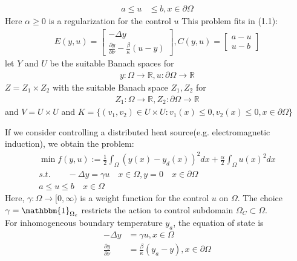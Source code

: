 \begin{example}
\begin{align*}
	a \le u &\le b, x \in \partial \Omega
\end{align*}
Here $\alpha \geq 0$ is a regularization for the control $u$
This problem fits in (1.1):
\begin{align*}
	E(y, u) = 
	\begin{bmatrix}
		- \Delta y \\
		\frac{\partial y}{\partial \nu} - \frac{\beta}{\kappa}(u - y)
	\end{bmatrix}, 
	C(y, u) =
	\begin{bmatrix}
		a - u\\
		u - b
	\end{bmatrix}
\end{align*}
let $Y$ and $U$ be the suitable Banach spaces for 
\begin{align*}
	y : \Omega \rightarrow \mathbb{R}, u: \partial \Omega \rightarrow \mathbb{R}
\end{align*}
$Z = Z_1 \times Z_2$ with the suitable Banach space $Z_1, Z_2$ for 
\begin{align*}
	Z_1: \Omega \rightarrow \mathbb{R}, Z_2: \partial \Omega \rightarrow \mathbb{R}
\end{align*}
and $V = U \times U$ and $K = \{(v_1, v_2) \in U \times U: v_1(x) \le 0, v_2(x) \le 0, x \in \partial \Omega\}$
\end{example}

\begin{example}
If we consider controlling a distributed heat source(e.g. electromagnetic induction), we obtain the problem:
\begin{align*}
	\min f(y, u):= \frac{1}{2} \int_\Omega (y(x) - y_d(x))^2 dx + \frac{\alpha}{2} \int_\Omega u(x)^2 dx\\
	s.t. \qquad - \Delta y = \gamma u \quad x \in\Omega, y= 0 \quad x \in \partial \Omega \\
	a \le u \le b \quad x \in \Omega
\end{align*}
	Here, $\gamma: \Omega \rightarrow [0, \infty)$ is a weight function for the control $u$ on $\Omega$. The choice $\gamma = \mathbbm{1}_{\Omega_c}$ restricts the action to control subdomain $\Omega_C \subset \Omega$. \\
	For inhomogeneous boundary temperature $y_a$, the equation of state is 
	\begin{align*}
		- \Delta y &= \gamma u, x \in \Omega\\
		\frac{\partial y}{\partial \nu} &= \frac{\beta}{\kappa}(y_a - y), x \in \partial \Omega
	\end{align*}
\end{example}

